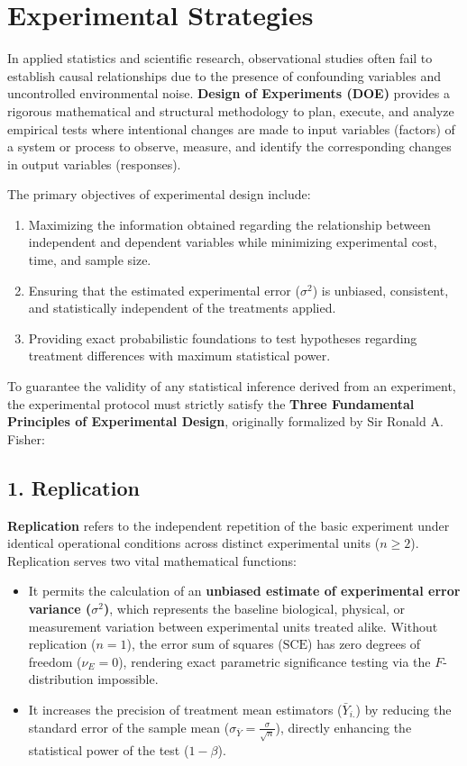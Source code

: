 \section{Experimental Strategies}

In applied statistics and scientific research, observational studies often fail to establish causal relationships due to the presence of confounding variables and uncontrolled environmental noise. \textbf{Design of Experiments (DOE)} provides a rigorous mathematical and structural methodology to plan, execute, and analyze empirical tests where intentional changes are made to input variables (factors) of a system or process to observe, measure, and identify the corresponding changes in output variables (responses).

The primary objectives of experimental design include:
\begin{enumerate}
	\item Maximizing the information obtained regarding the relationship between independent and dependent variables while minimizing experimental cost, time, and sample size.
	\item Ensuring that the estimated experimental error ($\sigma^2$) is unbiased, consistent, and statistically independent of the treatments applied.
	\item Providing exact probabilistic foundations to test hypotheses regarding treatment differences with maximum statistical power.
\end{enumerate}

To guarantee the validity of any statistical inference derived from an experiment, the experimental protocol must strictly satisfy the \textbf{Three Fundamental Principles of Experimental Design}, originally formalized by Sir Ronald A. Fisher:

\subsection{1. Replication}
\textbf{Replication} refers to the independent repetition of the basic experiment under identical operational conditions across distinct experimental units ($n \geq 2$). Replication serves two vital mathematical functions:
\begin{itemize}
	\item It permits the calculation of an \textbf{unbiased estimate of experimental error variance ($\sigma^2$)}, which represents the baseline biological, physical, or measurement variation between experimental units treated alike. Without replication ($n=1$), the error sum of squares ($\text{SCE}$) has zero degrees of freedom ($\nu_E = 0$), rendering exact parametric significance testing via the $F$-distribution impossible.
	\item It increases the precision of treatment mean estimators ($\bar{Y}_{i.}$) by reducing the standard error of the sample mean ($\sigma_{\bar{Y}} = \frac{\sigma}{\sqrt{n}}$), directly enhancing the statistical power of the test ($1 - \beta$).
\end{itemize}

